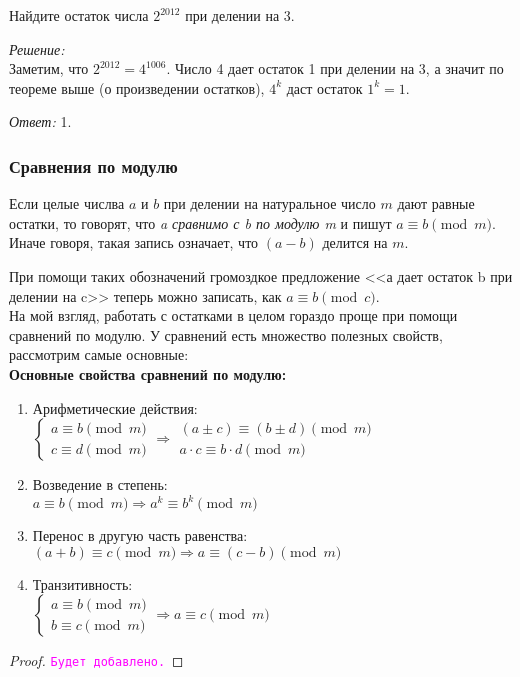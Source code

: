 \documentclass[11pt]{article}
\begin{document}
\begin{example}
	Найдите остаток числа $2^{2012}$ при делении на 3.
\end{example}
\textit{Решение:}\\
Заметим, что $2^{2012} = 4^{1006}$. Число 4  дает остаток 1 при делении на 3, а значит по теореме выше (о произведении остатков), $4^k$ даст остаток $1^k = 1$.

\textit{Ответ:} 1.

\subsubsection{Сравнения по модулю}
\begin{definition}
	Если целые числва $a$ и $b$ при делении на натуральное число $m$ дают равные остатки, то говорят, что \emph{a сравнимо с b по модулю m} и пишут $a \equiv b \pmod m$.
Иначе говоря, такая запись означает, что $(a - b)$ делится на $m$.
\end{definition}

При помощи таких обозначений громоздкое предложение <<а дает остаток b при делении на c>> теперь можно записать, как $a \equiv b \pmod c$.\\

На мой взгляд, работать с остатками в целом гораздо проще при помощи сравнений по модулю. У сравнений есть множество полезных свойств, рассмотрим самые основные:\\

\textbf{Основные свойства сравнений по модулю:}
\begin{enumerate}
	\item Арифметические действия:\\
	$\begin{cases}
	a \equiv b \pmod m \\
	c \equiv d \pmod m
	\end{cases} \Longrightarrow \left . \begin{array}{l}(a \pm c) \equiv (b \pm d) \pmod m \\ a \cdot c \equiv b \cdot d \pmod m \end{array} \right .$
	\item Возведение в степень:\\
	$a \equiv b \pmod m \Longrightarrow a^k \equiv b^k \pmod m$
	\item
	Перенос в другую часть равенства:\\
	$(a + b) \equiv c \pmod m \Longrightarrow a \equiv (c - b) \pmod m$
	\item Транзитивность:\\
	$\begin{cases} a \equiv b \pmod m \\ b \equiv c \pmod m\end{cases} \Longrightarrow a \equiv c \pmod m$
\end{enumerate}
\begin{proof}

	\textcolor{magenta}{\texttt{Будет добавлено.}}

\end{proof}
\end{document}
